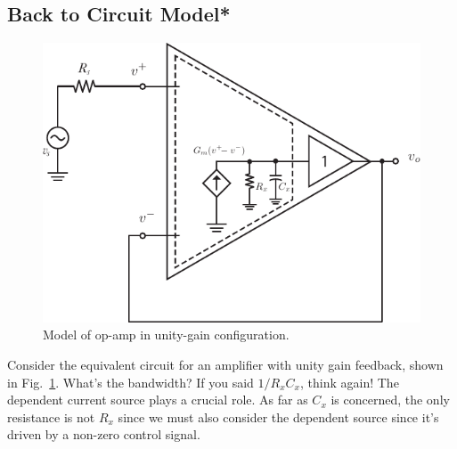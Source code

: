 \subsection{Back to Circuit Model*}
\begin{figure}[tb]
\centering
\includegraphics[scale=1]{opamp_model_fb_unity}
\caption{Model of op-amp in unity-gain configuration.}
\label{fig:opamp_model_fb_unity}
\end{figure}
Consider the equivalent circuit for an amplifier with unity gain feedback, shown in Fig.~\ref{fig:opamp_model_fb_unity}.  What's the bandwidth?  If you said $1/R_x C_x$, think again!  The dependent current source plays a crucial role.  As far as $C_x$ is concerned, the only resistance is not $R_x$ since we must also consider the dependent source since it's driven by a non-zero control signal.
